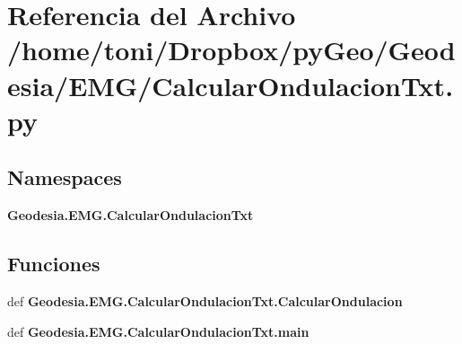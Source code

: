 \section{Referencia del Archivo /home/toni/\-Dropbox/py\-Geo/\-Geodesia/\-E\-M\-G/\-Calcular\-Ondulacion\-Txt.py}
\label{CalcularOndulacionTxt_8py}
\subsection*{Namespaces}
\begin{DoxyCompactItemize}
\item 
{\bf Geodesia.\-E\-M\-G.\-Calcular\-Ondulacion\-Txt}
\end{DoxyCompactItemize}
\subsection*{Funciones}
\begin{DoxyCompactItemize}
\item 
def {\bf Geodesia.\-E\-M\-G.\-Calcular\-Ondulacion\-Txt.\-Calcular\-Ondulacion}
\item 
def {\bf Geodesia.\-E\-M\-G.\-Calcular\-Ondulacion\-Txt.\-main}
\end{DoxyCompactItemize}
